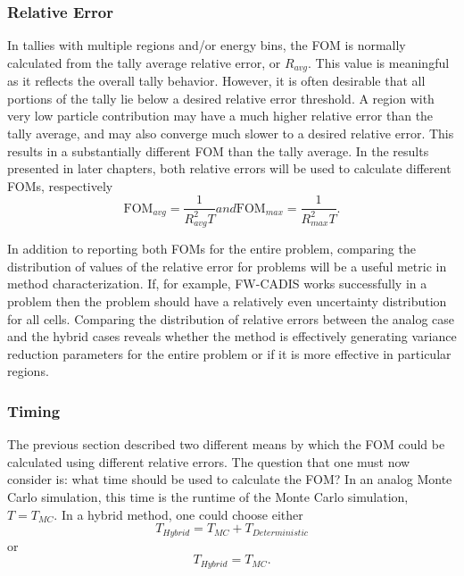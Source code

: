 \subsubsection{Relative Error}

In tallies with multiple regions and/or energy bins, the FOM is normally calculated
from the tally average relative error, or $R_{avg}$. This value is meaningful as
it reflects the overall tally behavior. However, it is often desirable that all
portions of the tally lie below a desired relative error threshold. A region
with very low particle contribution may have a much higher relative error than
the tally average, and may also converge much slower to a desired relative
error. This results in a substantially different FOM than
the tally average. In the results presented in later chapters, both relative
errors will be used to calculate different FOMs, respectively
\begin{subequations}
  \begin{equation}
    \text{FOM}_{avg} = \frac{1}{R_{avg}^{2}T}
  \label{eq:FOMavg}
  \end{equation}
and
  \begin{equation}
    \text{FOM}_{max} = \frac{1}{R_{max}^{2}T} .
  \label{eq:FOMmax}
  \end{equation}
  \label{eq:FOMerror}
\end{subequations}

In addition to reporting both FOMs for the entire problem, comparing the
distribution of values of the relative error for problems will be a useful
metric in method characterization. If, for example, FW-CADIS works successfully
in a problem then the problem should have a relatively even uncertainty
distribution for all cells. Comparing the distribution of relative errors
between the analog case and the hybrid cases reveals whether the method is
effectively generating variance reduction parameters for the entire problem or
if it is more effective in particular regions.

\subsubsection{Timing}

The previous section described two different means by which the FOM could be
calculated using different relative errors. The question that one must
now consider is: what time should be used to
calculate the FOM? In an analog Monte Carlo simulation, this time is the runtime
of the Monte Carlo simulation, $T = T_{MC}$. In a hybrid method, one could choose
either
\begin{equation}
  T_{Hybrid} = T_{MC} + T_{Deterministic}
\label{eq:hybridtime}
\end{equation}
or
\begin{equation}
  T_{Hybrid} = T_{MC} .
\end{equation}

